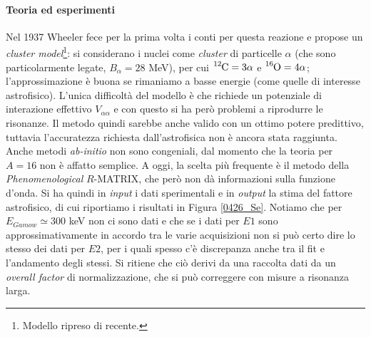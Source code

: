 \paragraph{Teoria ed esperimenti}
Nel 1937 Wheeler fece per la prima volta i conti per questa reazione e propose un \textit{cluster model}\footnote{Modello ripreso di recente.}: si considerano i nuclei come \textit{cluster} di particelle $\alpha$ (che sono particolarmente legate, $B_\alpha = 28$ MeV), per cui $\ce{^{12}C}=3\alpha$ e $\ce{^{16}O}=4\alpha$; l'approssimazione è buona se rimaniamo a basse energie (come quelle di interesse astrofisico).  
L'unica difficoltà del modello è che richiede un potenziale di interazione effettivo $V_{\alpha \alpha}$ e con questo si ha però problemi a riprodurre le risonanze. Il metodo quindi sarebbe anche valido con un ottimo potere predittivo, tuttavia l'accuratezza richiesta dall'astrofisica non è ancora stata raggiunta.\\ 
Anche metodi \textit{ab-initio} non sono congeniali, dal momento che la teoria per $A=16$ non è affatto semplice. A oggi, la scelta più frequente è il metodo della \textit{Phenomenological} $R$-MATRIX, che però non dà informazioni sulla funzione d'onda.
Si ha quindi in \textit{input} i dati sperimentali e in \textit{output} la stima del fattore astrofisico, di cui riportiamo i risultati in Figura \ref{0426_Se}. Notiamo che per $E_{Gamow} \simeq 300$ keV non ci sono dati e che se i dati per $E1$ sono approssimativamente in accordo tra le varie acquisizioni non si può certo dire lo stesso dei dati per $E2$, per i quali spesso c'è discrepanza anche tra il fit e l'andamento degli stessi. Si ritiene che ciò derivi da una raccolta dati  da un \textit{overall factor} di normalizzazione, che si può correggere con misure a risonanza larga. %

